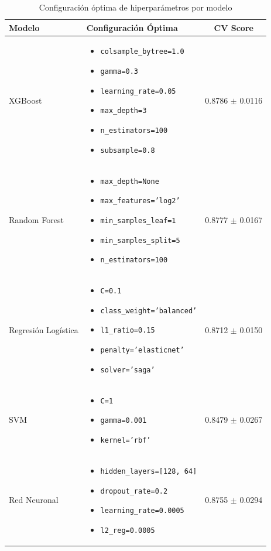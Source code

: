 \documentclass[conference]{IEEEtran}
\begin{document}
\begin{table}[htbp]
\centering
\caption{Configuración óptima de hiperparámetros por modelo}
\label{tab:hyperparameters}
\begin{tabular}{|p{1.2cm}|p{4.5cm}|c|}
\hline
\textbf{Modelo} & \textbf{Configuración Óptima} & \textbf{CV Score} \\
\hline
XGBoost & 
\begin{itemize}[nosep, leftmargin=*, topsep=0pt]
    \item \texttt{colsample\_bytree=1.0}
    \item \texttt{gamma=0.3}
    \item \texttt{learning\_rate=0.05}
    \item \texttt{max\_depth=3}
    \item \texttt{n\_estimators=100}
    \item \texttt{subsample=0.8}
\end{itemize}
& 0.8786 $\pm$ 0.0116 \\
\hline
Random Forest &
\begin{itemize}[nosep, leftmargin=*, topsep=0pt]
    \item \texttt{max\_depth=None}
    \item \texttt{max\_features='log2'}
    \item \texttt{min\_samples\_leaf=1}
    \item \texttt{min\_samples\_split=5}
    \item \texttt{n\_estimators=100}
\end{itemize}
& 0.8777 $\pm$ 0.0167 \\
\hline
Regresión Logística &
\begin{itemize}[nosep, leftmargin=*, topsep=0pt]
    \item \texttt{C=0.1}
    \item \texttt{class\_weight='balanced'}
    \item \texttt{l1\_ratio=0.15}
    \item \texttt{penalty='elasticnet'}
    \item \texttt{solver='saga'}
\end{itemize}
& 0.8712 $\pm$ 0.0150 \\
\hline
SVM & 
\begin{itemize}[nosep, leftmargin=*, topsep=0pt]
    \item \texttt{C=1}
    \item \texttt{gamma=0.001}
    \item \texttt{kernel='rbf'}
\end{itemize}
& 0.8479 $\pm$ 0.0267 \\
\hline
Red Neuronal &
\begin{itemize}[nosep, leftmargin=*, topsep=0pt]
    \item \texttt{hidden\_layers=[128, 64]}
    \item \texttt{dropout\_rate=0.2}
    \item \texttt{learning\_rate=0.0005}
    \item \texttt{l2\_reg=0.0005}
\end{itemize}
& 0.8755 $\pm$ 0.0294 \\
\hline
\end{tabular}
\end{table}
\end{document}
